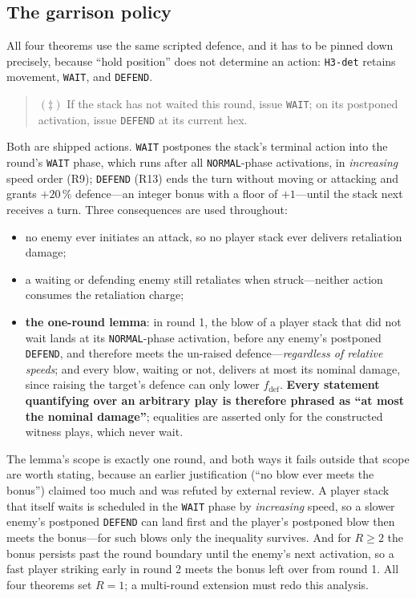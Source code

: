\documentclass[11pt,a4paper]{article}
\theoremstyle{plain}
\theoremstyle{definition}
\theoremstyle{plain}
\theoremstyle{definition}
\theoremstyle{remark}
\begin{document}
\subsection{The garrison policy}\label{sec:policy}

All four theorems use the same scripted defence, and it has to be pinned down precisely,
because ``hold position'' does not determine an action: \texttt{H3-det} retains movement,
\texttt{WAIT}, and \texttt{DEFEND}.

\begin{quote}
$(\ddagger)$ If the stack has not waited this round, issue \texttt{WAIT}; on its postponed
activation, issue \texttt{DEFEND} at its current hex.
\end{quote}

Both are shipped actions. \texttt{WAIT} postpones the stack's terminal action into the round's
\texttt{WAIT} phase, which runs after all \texttt{NORMAL}-phase activations, in \emph{increasing}
speed order (R9); \texttt{DEFEND} (R13) ends the turn without moving or attacking and grants
$+20\,\%$ defence---an integer bonus with a floor of $+1$---until the stack next receives a turn.
Three consequences are used throughout:

\begin{itemize}
\item no enemy ever initiates an attack, so no player stack ever delivers retaliation damage;
\item a waiting or defending enemy still retaliates when struck---neither action consumes the
  retaliation charge;
\item \textbf{the one-round lemma}: in round 1, the blow of a player stack that did not wait
  lands at its \texttt{NORMAL}-phase activation, before any enemy's postponed \texttt{DEFEND},
  and therefore meets the un-raised defence---\emph{regardless of relative speeds}; and every
  blow, waiting or not, delivers at most its nominal damage, since raising the target's defence
  can only lower $f_{\mathrm{def}}$. \textbf{Every statement quantifying over an arbitrary play
  is therefore phrased as ``at most the nominal damage''}; equalities are asserted only for the
  constructed witness plays, which never wait.
\end{itemize}

The lemma's scope is exactly one round, and both ways it fails outside that scope are worth
stating, because an earlier justification (``no blow ever meets the bonus'') claimed too much and
was refuted by external review. A player stack that itself waits is scheduled in the
\texttt{WAIT} phase by \emph{increasing} speed, so a slower enemy's postponed \texttt{DEFEND} can
land first and the player's postponed blow then meets the bonus---for such blows only the
inequality survives. And for $R\ge 2$ the bonus persists past the round boundary until the
enemy's next activation, so a fast player striking early in round 2 meets the bonus left over
from round 1. All four theorems set $R=1$; a multi-round extension must redo this analysis.
\end{document}
